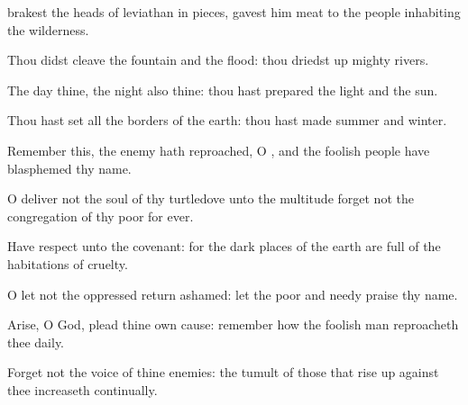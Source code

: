 {brakest the
heads of
leviathan in pieces,
{}
gavest him
{}
meat to the
people inhabiting the
wilderness.
\par }{\Q {}Thou didst
cleave the
fountain and the
flood: thou driedst
up
mighty
rivers.
\par }{\Q {}The
day
{} thine, the
night also
{} thine: thou hast
prepared the
light and the
sun.
\par }{\Q {}Thou hast
set all the
borders of the
earth: thou hast
made
summer and
winter.
\par }{\BB \par }{\Q {}Remember this,
{} the
enemy hath
reproached, O
{}, and
{} the
foolish
people have
blasphemed thy
name.
\par }{\Q {}O
deliver not the
soul of thy
turtledove unto the
multitude
{}
forget not the
congregation of thy
poor for
ever.
\par }{\Q {}Have
respect unto the
covenant: for the
dark places of the
earth are
full of the
habitations of
cruelty.
\par }{\Q {}O let not the
oppressed
return
ashamed: let the
poor and
needy
praise thy
name.
\par }{\Q {}Arise, O
God,
plead thine own
cause:
remember how the foolish
man
reproacheth thee
daily.
\par }{\Q {}Forget not the
voice of thine
enemies: the
tumult of those that rise
up against thee
increaseth
continually.

}
